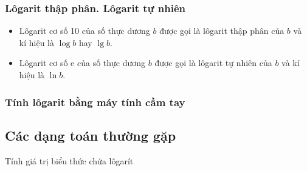 \begin{tomtat}
	\subsubsection{Lôgarit thập phân. Lôgarit tự nhiên}
	\begin{itemize}
		\item Lôgarit cơ số 10 của số thực dương $b$ được gọi là lôgarit thập phân của $b$ và kí hiệu là $\log b$ hay $\lg b$.
		\item Lôgarit cơ số $\mathrm{e}$ của số thực dương $b$ được gọi là lôgarit tự nhiên của $b$ và kí hiệu là $\ln b$.
	\end{itemize}
	\subsubsection{Tính lôgarit bằng máy tính cầm tay}
	
%	
\end{tomtat}
\setcounter{subsubsection}{0}
\setcounter{ex}{0}
\setcounter{bt}{0}
\subsection{Các dạng toán thường gặp}
\begin{dang}{Tính giá trị biểu thức chứa lôgarít}
\end{dang}
